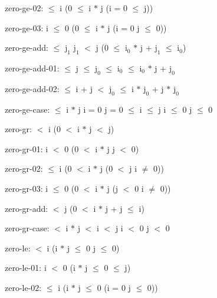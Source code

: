\documentclass[a4paper]{article}
\begin{document}
\item	zero-ge-02:   $\le$ i \Imp (0 $\le$ i $*$ j \Equiv \Not \Not (i = 0  $\le$ j))

\item	zero-ge-03:  \Fol i $\le$ 0 \Imp (0 $\le$ i $*$ j \Equiv \Not \Not (i = 0 \Or j $\le$ 0))

\item	zero-ge-add:   $\le$ $\mbox{j}_{1}$ \And $\mbox{j}_{1}$ $<$ j \Imp (0 $\le$ $\mbox{i}_{0}$ $*$ j + $\mbox{j}_{1}$  $\le$ $\mbox{i}_{0}$)

\item	zero-ge-add-01:   $\le$ j  $\le$ $\mbox{j}_{0}$  $\le$ $\mbox{i}_{0}$  $\le$ $\mbox{i}_{0}$ $*$ j + $\mbox{j}_{0}$

\item	zero-ge-add-02:   $\le$ i + j  $<$ $\mbox{j}_{0}$  $\le$ i $*$ $\mbox{j}_{0}$ + j $*$ $\mbox{j}_{0}$

\item	zero-ge-case:   $\le$ i $*$ j \Equiv i = 0 \Or j = 0  $\le$ i  $\le$ j \Or i $\le$ 0 \And j $\le$ 0

\item	zero-gr:   $<$ i \Imp (0 $<$ i $*$ j  $<$ j)

\item	zero-gr-01:  \Fol i $<$ 0 \Imp (0 $<$ i $*$ j \Equiv j $<$ 0)

\item	zero-gr-02:   $\le$ i \Imp (0 $<$ i $*$ j \Equiv \Not \Not (0 $<$ j \And i $\neq$ 0))

\item	zero-gr-03:  \Fol i $\le$ 0 \Imp (0 $<$ i $*$ j \Equiv \Not \Not (j $<$ 0 \And i $\neq$ 0))

\item	zero-gr-add:   $<$ j \Imp (0 $<$ i $*$ j + j  $\le$ i)

\item	zero-gr-case:   $<$ i $*$ j  $<$ i  $<$ j \Or i $<$ 0 \And j $<$ 0

\item	zero-le:   $<$ i \Imp (i $*$ j $\le$ 0 \Equiv j $\le$ 0)

\item	zero-le-01:  \Fol i $<$ 0 \Imp (i $*$ j $\le$ 0  $\le$ j)

\item	zero-le-02:   $\le$ i \Imp (i $*$ j $\le$ 0 \Equiv \Not \Not (i = 0 \Or j $\le$ 0))
\end{document}
